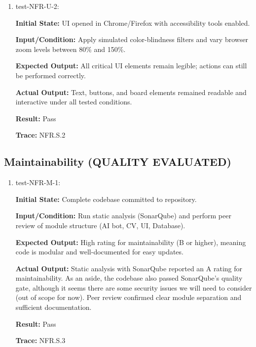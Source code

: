 \documentclass[12pt, titlepage]{article}
\begin{document}
\begin{enumerate}
\begin{figure}[H]
\centering
{}
\caption{Visual Comparison of Usability Categories}
\end{figure}

\item test-NFR-U-2:

\textbf{Initial State:} UI opened in Chrome/Firefox with accessibility tools enabled.

\textbf{Input/Condition:} Apply simulated color-blindness filters and vary browser zoom levels between 80\% and 150\%.

\textbf{Expected Output:} All critical UI elements remain legible; actions can still be performed correctly.

\textbf{Actual Output:} Text, buttons, and board elements remained readable and interactive under all tested conditions.

\textbf{Result:} Pass

\textbf{Trace:} NFR.S.2
\end{enumerate}

\subsection{Maintainability (QUALITY EVALUATED)}

\begin{enumerate}
\item test-NFR-M-1:

\textbf{Initial State:} Complete codebase committed to repository.

\textbf{Input/Condition:} Run static analysis (SonarQube) and perform peer review of module structure (AI bot, CV, UI, Database).

\textbf{Expected Output:} High rating for maintainability (B or higher), meaning code is modular and well-documented for easy updates.

\textbf{Actual Output:} Static analysis with SonarQube reported an A rating for maintainability. As an aside, the codebase also passed SonarQube's quality gate, although it seems there are some security issues we will need to consider (out of scope for now). Peer review confirmed clear module separation and sufficient documentation.

\textbf{Result:} Pass

\textbf{Trace:} NFR.S.3
\end{enumerate}
\end{document}
